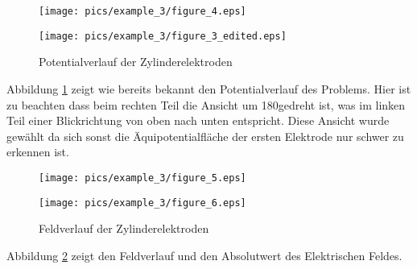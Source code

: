 \begin{figure}[htbp]
	\begin{minipage}{0.5\textwidth}
		\texttt{[image: pics/example\_3/figure\_4.eps]}
	\end{minipage}
	\begin{minipage}{0.5\textwidth}
		\texttt{[image: pics/example\_3/figure\_3\_edited.eps]}
	\end{minipage}
	\caption{Potentialverlauf der Zylinderelektroden}
	\label{fig:cylinder_electrodes_potential}
\end{figure}

Abbildung \ref{fig:cylinder_electrodes_potential} zeigt wie bereits bekannt den Potentialverlauf des Problems. Hier ist zu beachten dass beim rechten Teil die Ansicht um 180\degrees gedreht ist, was im linken Teil einer Blickrichtung von oben nach unten entspricht. Diese Ansicht wurde gewählt da sich sonst die Äquipotentialfläche der ersten Elektrode nur schwer zu erkennen ist.


\begin{figure}[htbp]
	\begin{minipage}{0.5\textwidth}
		\texttt{[image: pics/example\_3/figure\_5.eps]}
	\end{minipage}
	\begin{minipage}{0.5\textwidth}
		\texttt{[image: pics/example\_3/figure\_6.eps]}
	\end{minipage}
	\caption{Feldverlauf der Zylinderelektroden}
	\label{fig:cylinder_electrodes_field}
\end{figure}


Abbildung \ref{fig:cylinder_electrodes_field} zeigt den Feldverlauf und den Absolutwert des Elektrischen Feldes.